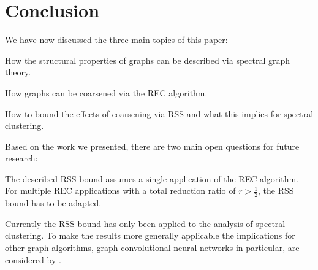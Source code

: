 \section{Conclusion}%
\label{sec:conclusion}

We have now discussed the three main topics of this paper:
\begin{enumerate*}
	\item How the structural properties of graphs can be described via spectral graph theory.
	\item How graphs can be coarsened via the REC algorithm.
	\item How to bound the effects of coarsening via RSS and what this implies for spectral clustering.
\end{enumerate*}


Based on the work we presented, there are two main open questions for future research:
\begin{enumerate*}
	\item The described RSS bound assumes a single application of the REC algorithm.
		For multiple REC applications with a total reduction ratio of $r > \frac{1}{2}$, the RSS bound has to be adapted.
	\item Currently the RSS bound has only been applied to the analysis of spectral clustering.
		To make the results more generally applicable the implications for other graph algorithms, graph convolutional neural networks in particular, are considered by \citet{Loukas2018}.
\end{enumerate*}
